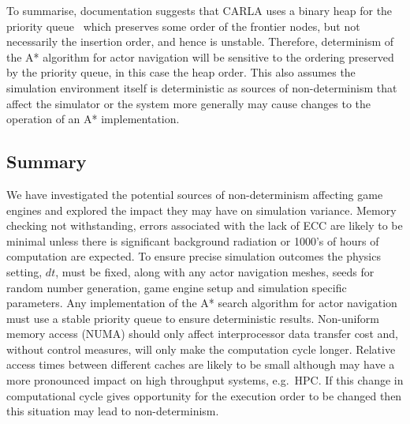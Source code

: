 To summarise, documentation suggests that CARLA uses a binary heap for the priority queue~\cite{FGraphAStar,TArray,GraphAStar} which preserves some order of the frontier nodes, but not necessarily the insertion order, and hence is unstable. Therefore, determinism of the A* algorithm for actor navigation will be sensitive to the ordering preserved by the priority queue, in this case the heap order. This also assumes the simulation environment itself is deterministic as sources of non-determinism that affect the simulator or the system more generally may cause changes to the operation of an A* implementation.





\subsection{Summary}
We have investigated the potential sources of non-determinism affecting game engines and explored the impact they may have on simulation variance. Memory checking not withstanding, errors associated with the lack of ECC are likely to be minimal unless there is significant background radiation or 1000's of hours of computation are expected. To ensure precise simulation outcomes the physics setting, $dt$, must be fixed, along with any actor navigation meshes, seeds for random number generation, game engine setup and simulation specific parameters. %
%
Any implementation of the A* search algorithm for actor navigation must use a stable priority queue to ensure deterministic results. 
%
Non-uniform memory access (NUMA) should only affect interprocessor data transfer cost and, without control measures, will only make the computation cycle longer. Relative access times between different caches are likely to be small although may have a more pronounced impact on high throughput systems, e.g.\ HPC. If this change in computational cycle gives opportunity for the execution order to be changed then this situation may lead to non-determinism. 

